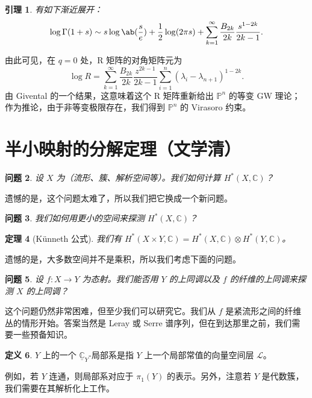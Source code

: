 \documentclass{amsart}
\newtheorem{thm}{定理}[section]
\newtheorem{lem}[thm]{引理}
\newtheorem{quest}[thm]{问题}
\theoremstyle{definition}
\newtheorem{defn}[thm]{定义}
\theoremstyle{remark}
\theoremstyle{plain}
\theoremstyle{definition}
\theoremstyle{remark}
\newcommand{\C}{\mathbb{C}}
\renewcommand{\P}{\mathbb{P}}
\newcommand{\mc}[1]{\mathcal{#1}}
\newcommand{\ul}[1]{\underline{#1}}
\newcommand{\1}{\mathbf{1}}
\newcommand{\2}{\mathbf{2}}
\newcommand{\3}{\mathbf{3}}
\begin{document}
\begin{lem}
    有如下渐近展开：
    \[ \log \Gamma(1+s) \sim s \log \ab(\frac{s}{e}) + \frac{1}{2} \log(2\pi s) + \sum_{k=1}^{\infty} \frac{B_{2k}}{2k} \frac{s^{1-2k}}{2k-1}. \]
\end{lem}
由此可见，在 \(q = 0\) 处，R 矩阵的对角矩阵元为
\[ \log R = \sum_{k=1}^{\infty} \frac{B_{2k}}{2k} \frac{z^{2k-1}}{2k-1} \sum_{i =1}^n (\lambda_i - \lambda_{n+1})^{1-2k}. \]
由 Givental 的一个结果，这意味着这个 R 矩阵重新给出 \(\P^n\) 的等变 GW 理论；作为推论，由于非等变极限存在，我们得到 \(\P^n\) 的 Virasoro 约束。


\section{半小映射的分解定理（文学清）}%
\label{sec:Decomposition theorem for semi-small maps (Xueqing Wen)}

\begin{quest}
    设 \(X\) 为（流形、簇、解析空间等）。我们如何计算 \(H^*(X, \C)\)？
\end{quest}

遗憾的是，这个问题太难了，所以我们把它换成一个新问题。

\begin{quest}
    我们如何用更小的空间来探测 \(H^*(X, \C)\)？
\end{quest}

\begin{thm}[K\"unneth 公式]
    我们有 \(H^*(X \times Y, \C) = H^*(X, \C) \otimes H^*(Y, \C)\)。
\end{thm}

遗憾的是，大多数空间并不是乘积，所以我们考虑下面的问题。

\begin{quest}
    设 \(f \colon X \to Y\) 为态射。我们能否用 \(Y\) 的上同调以及 \(f\) 的纤维的上同调来探测 \(X\) 的上同调？
\end{quest}

这个问题仍然非常困难，但至少我们可以研究它。我们从 \(f\) 是紧流形之间的纤维丛的情形开始。答案当然是 Leray 或 Serre 谱序列，但在到达那里之前，我们需要一些预备知识。

\begin{defn}
    \(Y\) 上的一个 \(\ul{\C}_Y\)-局部系是指 \(Y\) 上一个局部常值的向量空间层 \(\mc{L}\)。
\end{defn}

例如，若 \(Y\) 连通，则局部系对应于 \(\pi_1(Y)\) 的表示。另外，注意若 \(Y\) 是代数簇，我们需要在其解析化上工作。
\end{document}
